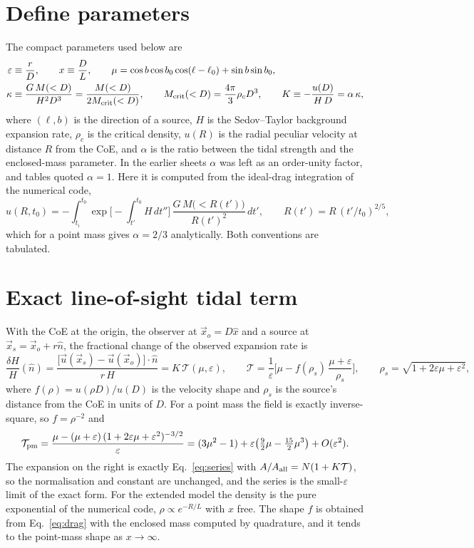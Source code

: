 \documentclass[10pt]{article}
\begin{document}
\section{Define parameters}\label{sec:define}
The compact parameters used below are
\begin{align}
\varepsilon&\equiv\frac{r}{D},\qquad x\equiv\frac{D}{L},\qquad \mu=\cos b\cos b_0\cos(\ell-\ell_0)+\sin b\sin b_0,\label{eq:def1}\\
\kappa&\equiv\frac{G\,M(<D)}{H^2D^3}=\frac{M(<D)}{2M_{\rm crit}(<D)},\qquad M_{\rm crit}(<D)=\frac{4\pi}{3}\rho_cD^3,\qquad K\equiv-\frac{u(D)}{H\,D}=\alpha\,\kappa,\label{eq:def2}
\end{align}
where $(\ell,b)$ is the direction of a source, $H$ is the Sedov--Taylor background expansion rate, $\rho_c$ is the critical density, $u(R)$ is the radial peculiar velocity at distance $R$ from the CoE, and $\alpha$ is the ratio between the tidal strength and the enclosed-mass parameter. In the earlier sheets $\alpha$ was left as an order-unity factor, and tables quoted $\alpha=1$. Here it is computed from the ideal-drag integration of the numerical code,
\begin{equation}
u(R,t_0)=-\int_{t_i}^{t_0}\exp\!\Big[-\!\int_{t'}^{t_0}H\,dt''\Big]\,\frac{G\,M\big(<R(t')\big)}{R(t')^2}\,dt',\qquad R(t')=R\,(t'/t_0)^{2/5},
\label{eq:drag}
\end{equation}
which for a point mass gives $\alpha=2/3$ analytically. Both conventions are tabulated.

\section{Exact line-of-sight tidal term}
With the CoE at the origin, the observer at $\vec x_o=D\hat x$ and a source at $\vec x_s=\vec x_o+r\hat n$, the fractional change of the observed expansion rate is
\begin{equation}
\frac{\delta H}{H}(\hat n)=\frac{\big[\vec u(\vec x_s)-\vec u(\vec x_o)\big]\cdot\hat n}{r\,H}=K\,\mathcal T(\mu,\varepsilon),\qquad
\mathcal T=\frac{1}{\varepsilon}\Big[\mu-f(\rho_s)\,\frac{\mu+\varepsilon}{\rho_s}\Big],\qquad \rho_s=\sqrt{1+2\varepsilon\mu+\varepsilon^2},
\label{eq:exact}
\end{equation}
where $f(\rho)=u(\rho D)/u(D)$ is the velocity shape and $\rho_s$ is the source's distance from the CoE in units of $D$. For a point mass the field is exactly inverse-square, so $f=\rho^{-2}$ and
\begin{equation}
\mathcal T_{\rm pm}=\frac{\mu-(\mu+\varepsilon)\,(1+2\varepsilon\mu+\varepsilon^2)^{-3/2}}{\varepsilon}
=(3\mu^2-1)+\varepsilon\big(\tfrac92\mu-\tfrac{15}{2}\mu^3\big)+O(\varepsilon^2).
\label{eq:pm}
\end{equation}
The expansion on the right is exactly Eq.~\eqref{eq:series} with $A/A_{\rm all}=N(1+K\mathcal T)$, so the normalisation and constant are unchanged, and the series is the small-$\varepsilon$ limit of the exact form. For the extended model the density is the pure exponential of the numerical code, $\rho\propto e^{-R/L}$ with $x$ free. The shape $f$ is obtained from Eq.~\eqref{eq:drag} with the enclosed mass computed by quadrature, and it tends to the point-mass shape as $x\to\infty$.
\end{document}
